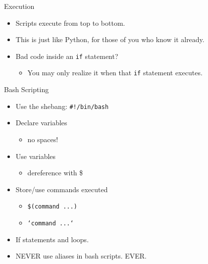 \documentclass[11pt]{beamer}
\begin{document}
\begin{frame}[fragile]{Execution}
  \begin{itemize}[<+- | alert@+>]
    \item Scripts execute from top to bottom.
    \item This is just like Python, for those of you who know it already.
    \item Bad code inside an \texttt{if} statement?
    \begin{itemize}[<+- | alert@+>]
      \item You may only realize it when that \texttt{if} statement executes.
    \end{itemize}
  \end{itemize}
\end{frame}

\begin{frame}[fragile]{Bash Scripting}
  \hspace*{-5ex}
  \begin{minipage}[t]{\textwidth}
      \begin{minipage}[t]{.48\textwidth}
        \begin{itemize}[<+- | alert@+>]
          \item Use the shebang: \texttt{\#!/bin/bash}
          \item Declare variables
          \begin{itemize}[<+- | alert@+>]
            \item no spaces!
          \end{itemize}
          \item Use variables
          \begin{itemize}[<+- | alert@+>]
            \item dereference with \$
          \end{itemize}
          \item Store/use commands executed
          \begin{itemize}[<+- | alert@+>]
            \item \texttt{\$(command ...)}
            \item \texttt{`command ...`}
          \end{itemize}
          \item If statements and loops.
          \item NEVER use aliases in bash scripts. EVER.
        \end{itemize}
      \end{minipage}
      \hfill
      \begin{minipage}[t]{.5\textwidth}

\end{minipage}
\end{minipage}
\end{frame}
\end{document}

